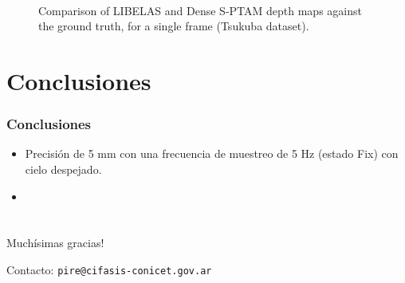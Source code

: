 \documentclass[compress]{beamer}
\begin{document}
\begin{frame}
\begin{figure}[!htb]
{		\label{tsukuba_frame1314_dense}}
	\hfil
	\\
	\caption{Comparison of LIBELAS and Dense S-PTAM depth maps against the ground truth, for a single frame (Tsukuba dataset).}
	\label{fig:tsukuba_frame1314}
\end{figure}
\end{frame}


\section{Conclusiones}

\begin{frame}
	\frametitle{Conclusiones}
	\begin{itemize}
		\item Precisión de 5 mm con una frecuencia de muestreo de 5 Hz (estado Fix) con cielo despejado.
		\item 
	\end{itemize}
\end{frame}


\section*{}

\begin{frame}
	\centering
	\Large{Muchísimas gracias!}
	
	
	\vspace{2cm}
	Contacto: {\tt pire@cifasis-conicet.gov.ar}
\end{frame}



\end{document}
